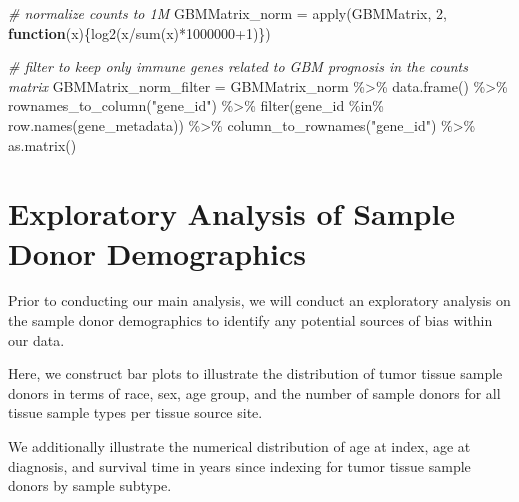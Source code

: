 \documentclass[
]{article}
\newenvironment{Shaded}{\begin{snugshade}}{\end{snugshade}}
\newcommand{\CommentTok}[1]{\textcolor[rgb]{0.56,0.35,0.01}{\textit{#1}}}
\newcommand{\ControlFlowTok}[1]{\textcolor[rgb]{0.13,0.29,0.53}{\textbf{#1}}}
\newcommand{\DecValTok}[1]{\textcolor[rgb]{0.00,0.00,0.81}{#1}}
\newcommand{\FunctionTok}[1]{\textcolor[rgb]{0.00,0.00,0.00}{#1}}
\newcommand{\NormalTok}[1]{#1}
\newcommand{\OtherTok}[1]{\textcolor[rgb]{0.56,0.35,0.01}{#1}}
\newcommand{\SpecialCharTok}[1]{\textcolor[rgb]{0.00,0.00,0.00}{#1}}
\newcommand{\StringTok}[1]{\textcolor[rgb]{0.31,0.60,0.02}{#1}}
\begin{document}
\begin{Shaded}
\begin{Highlighting}[]
\CommentTok{\# normalize counts to 1M}
\NormalTok{GBMMatrix\_norm }\OtherTok{=} \FunctionTok{apply}\NormalTok{(GBMMatrix, }\DecValTok{2}\NormalTok{, }\ControlFlowTok{function}\NormalTok{(x)\{}\FunctionTok{log2}\NormalTok{(x}\SpecialCharTok{/}\FunctionTok{sum}\NormalTok{(x)}\SpecialCharTok{*}\DecValTok{1000000}\SpecialCharTok{+}\DecValTok{1}\NormalTok{)\})}

\CommentTok{\# filter to keep only immune genes related to GBM prognosis in the counts matrix}
\NormalTok{GBMMatrix\_norm\_filter }\OtherTok{=}\NormalTok{ GBMMatrix\_norm }\SpecialCharTok{\%\textgreater{}\%} 
  \FunctionTok{data.frame}\NormalTok{() }\SpecialCharTok{\%\textgreater{}\%} 
  \FunctionTok{rownames\_to\_column}\NormalTok{(}\StringTok{"gene\_id"}\NormalTok{) }\SpecialCharTok{\%\textgreater{}\%} 
  \FunctionTok{filter}\NormalTok{(gene\_id }\SpecialCharTok{\%in\%} \FunctionTok{row.names}\NormalTok{(gene\_metadata)) }\SpecialCharTok{\%\textgreater{}\%} 
  \FunctionTok{column\_to\_rownames}\NormalTok{(}\StringTok{"gene\_id"}\NormalTok{) }\SpecialCharTok{\%\textgreater{}\%} 
  \FunctionTok{as.matrix}\NormalTok{()}
\end{Highlighting}
\end{Shaded}

\newpage

\hypertarget{exploratory-analysis-of-sample-donor-demographics}{%
\section{Exploratory Analysis of Sample Donor
Demographics}\label{exploratory-analysis-of-sample-donor-demographics}}

Prior to conducting our main analysis, we will conduct an exploratory
analysis on the sample donor demographics to identify any potential
sources of bias within our data.

Here, we construct bar plots to illustrate the distribution of tumor
tissue sample donors in terms of race, sex, age group, and the number of
sample donors for all tissue sample types per tissue source site.

We additionally illustrate the numerical distribution of age at index,
age at diagnosis, and survival time in years since indexing for tumor
tissue sample donors by sample subtype.
\end{document}
